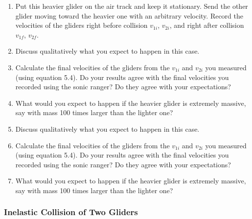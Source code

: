 \begin{enumerate}
\item Put this heavier glider on the air track and keep it stationary. Send the other glider moving toward the heavier one with an arbitrary velocity. Record the velocities of the gliders right before collision $v_{1i}$, $v_{2i}$, and right after collision $v_{1f}$, $v_{2f}$.
\item Discuss qualitatively what you expect to happen in this case.
    \item Calculate the final velocities of the gliders from the $v_{1i}$ and $v_{2i}$ you measured (using equation 5.4). Do your results agree with the final velocities you recorded using the sonic ranger? Do they agree with your expectations?
    \item What would you expect to happen if the heavier glider is extremely massive, say with mass 100 times larger than the lighter one?

  \item Discuss qualitatively what you expect to happen in this case.
    \item Calculate the final velocities of the gliders from the $v_{1i}$ and $v_{2i}$ you measured (using equation 5.4). Do your results agree with the final velocities you recorded using the sonic ranger? Do they agree with your expectations?
    \item What would you expect to happen if the heavier glider is extremely massive, say with mass 100 times larger than the lighter one?
\end{enumerate}

\subsubsection{Inelastic Collision of Two Gliders}

